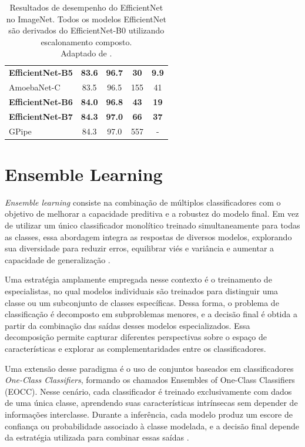 \begin{table}[htbp]
\begin{tabular}{lcccc}
		\midrule
		\textbf{EfficientNet-B5} & \textbf{83.6} & \textbf{96.7} & \textbf{30} & \textbf{9.9} \\
		AmoebaNet-C              & 83.5 & 96.5 & 155 & 41 \\
		
		\midrule
		\textbf{EfficientNet-B6} & \textbf{84.0} & \textbf{96.8} & \textbf{43} & \textbf{19} \\
		
		\midrule
		\textbf{EfficientNet-B7} & \textbf{84.3} & \textbf{97.0} & \textbf{66} & \textbf{37} \\
		GPipe                    & 84.3 & 97.0 & 557 & - \\
		
		\bottomrule
	\end{tabular}
	\caption{Resultados de desempenho do EfficientNet no ImageNet. Todos os modelos EfficientNet são derivados do EfficientNet-B0 utilizando escalonamento composto. \\
	Adaptado de \cite{ref-tan2019}.}
	\label{tab:efficientnet_full}
\end{table}

\section{Ensemble Learning}
	
\textit{Ensemble learning} consiste na combinação de múltiplos classificadores com o objetivo de melhorar a capacidade preditiva e a robustez do modelo final. Em vez de utilizar um único classificador monolítico treinado simultaneamente para todas as classes, essa abordagem integra as respostas de diversos modelos, explorando sua diversidade para reduzir erros, equilibrar viés e variância e aumentar a capacidade de generalização \cite{novotny2025eocc}.

Uma estratégia amplamente empregada nesse contexto é o treinamento de especialistas, no qual modelos individuais são treinados para distinguir uma classe ou um subconjunto de classes específicas. Dessa forma, o problema de classificação é decomposto em subproblemas menores, e a decisão final é obtida a partir da combinação das saídas desses modelos especializados. Essa decomposição permite capturar diferentes perspectivas sobre o espaço de características e explorar as complementaridades entre os classificadores.

Uma extensão desse paradigma é o uso de conjuntos baseados em classificadores \textit{One-Class Classifiers}, formando os chamados Ensembles of One-Class Classifiers (EOCC). Nesse cenário, cada classificador é treinado exclusivamente com dados de uma única classe, aprendendo suas características intrínsecas sem depender de informações interclasse. Durante a inferência, cada modelo produz um escore de confiança ou probabilidade associado à classe modelada, e a decisão final depende da estratégia utilizada para combinar essas saídas \cite{novotny2025eocc}.

